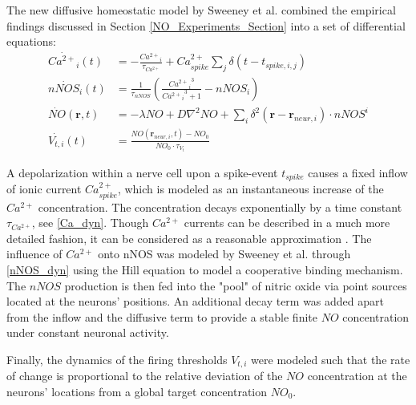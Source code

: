 \documentclass[10pt,a4paper]{article}
\begin{document}
The new diffusive homeostatic model by Sweeney et al. combined the empirical findings discussed in Section \ref{NO_Experiments_Section} into a set of differential equations:   
\begin{align}
\dot{{Ca^{2+}}_i}(t) &= -\frac{{Ca^{2+}}_i}{\tau_{Ca^{2+}}} + Ca^{2+}_{spike} \sum_{j} \delta(t-t_{spike,i,j}) \label{Ca_dyn}\\
\dot{nNOS_i}(t) &= \frac{1}{\tau_{nNOS}} \left(\frac{{{Ca^{2+}}_i}^3}{{{Ca^{2+}}_i}^3+1} - nNOS_i \right) \label{nNOS_dyn}\\
\dot{NO}(\mathbf{r},t)&=-\lambda NO + D \nabla^2 NO + \sum_{i} \delta^2(\mathbf{r}-\mathbf{r}_{neur,i})\cdot nNOS^i \label{NO_dyn}\\
\dot{V_{t,i}}(t) &= \frac{NO(\mathbf{r}_{neur,i},t)-NO_0}{NO_0\cdot\tau_{V_t}} \label{Theta_dyn}
\end{align}

A depolarization within a nerve cell upon a spike-event $t_{spike}$ causes a fixed inflow of ionic current $Ca^{2+}_{spike}$, which is modeled as an instantaneous increase of the $Ca^{2+}$ concentration. The concentration decays exponentially by a time constant $\tau_{Ca^{2+}}$, see \eqref{Ca_dyn}. Though $Ca^{2+}$ currents can be described in a much more detailed fashion, it can be considered as a reasonable approximation \cite[p.~198-203]{Theor_Neur_Dayan}. The influence of $Ca^{2+}$ onto nNOS was modeled by Sweeney et al. through \eqref{nNOS_dyn} using the Hill equation \cite{Hill_Equ} to model a cooperative binding mechanism. The $nNOS$ production is then fed into the "pool" of nitric oxide via point sources located at the neurons' positions. An additional decay term was added apart from the inflow and the diffusive term to provide a stable finite $NO$ concentration under constant neuronal activity.

Finally, the dynamics of the firing thresholds $V_{t,i}$ were modeled such that the rate of change is proportional to the relative deviation of the $NO$ concentration at the neurons' locations from a global target concentration $NO_0$. 
\end{document}
